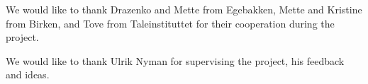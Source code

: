 We would like to thank Drazenko and Mette from Egebakken, Mette and Kristine from Birken, and Tove from Taleinstituttet for their cooperation during the project.

We would like to thank Ulrik Nyman for supervising the project, his feedback and ideas.